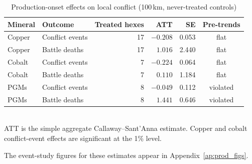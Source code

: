\begin{table}[htbp]
\centering
\caption{Production-onset effects on local conflict (100\,km, never-treated controls)}
\label{tab:prod_results}
\begin{tabular}{llrrrc}
\toprule
\textbf{Mineral} & \textbf{Outcome} & \textbf{Treated hexes} & \textbf{ATT} & \textbf{SE} & \textbf{Pre-trends} \\
\midrule
Copper & Conflict events & 17 & $-0.208$ & 0.053 & flat \\
Copper & Battle deaths   & 17 & $1.016$  & 2.440 & flat \\
Cobalt & Conflict events &  7 & $-0.224$ & 0.064 & flat \\
Cobalt & Battle deaths   &  7 & $0.110$  & 1.184 & flat \\
PGMs   & Conflict events &  8 & $-0.049$ & 0.112 & violated \\
PGMs   & Battle deaths   &  8 & $1.441$  & 0.646 & violated \\
\bottomrule
\end{tabular}
\\[4pt]
{\footnotesize ATT is the simple aggregate Callaway--Sant'Anna estimate. Copper
and cobalt conflict-event effects are significant at the 1\% level.}
\end{table}

\noindent The event-study figures for these estimates appear in Appendix~\ref{ap:prod_figs}.
